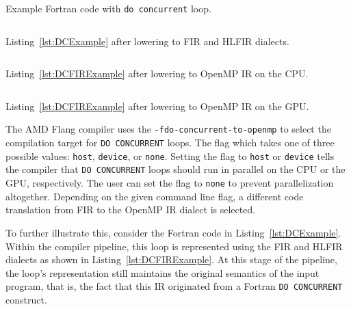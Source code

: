 \documentclass[acmtog,natbib=false]{acmart}
\newcommand{\code}[1]{\texttt{#1}\xspace}
\begin{document}
\begin{listing}[t]
\inputminted{Fortran}{code/dc_saxpy.f90}
\caption{Example Fortran code with \code{do concurrent} loop.}
\label{lst:DCExample}
\end{listing}

\begin{listing}[t]
\inputminted{MLIR-lexer.py:MlirLexer -x}{code/dc_fir.mlir}
\caption{Listing~\ref{lst:DCExample} after lowering to \acs{FIR} and \acs{HLFIR} dialects.}
\label{lst:DCFIRExample}
\end{listing}

\begin{listing}[t]
\inputminted{MLIR-lexer.py:MlirLexer -x}{code/dc_omp.mlir}
\caption{Listing~\ref{lst:DCFIRExample} after lowering to OpenMP \ac{IR} on the CPU.}
\label{lst:DCOMPExample}
\end{listing}

\begin{listing}[t]
\inputminted{MLIR-lexer.py:MlirLexer -x}{code/dc_omp_device.mlir}
\caption{Listing~\ref{lst:DCFIRExample} after lowering to OpenMP \ac{IR} on the GPU.}
\label{lst:DCOMPDeviceExample}
\end{listing}

The AMD Flang compiler uses the \code{-fdo-concurrent-to-openmp} to select the compilation target for \code{DO CONCURRENT} loops.  
The flag which takes one of three possible values: \code{host}, \code{device}, or \code{none}.
Setting the flag to \code{host} or \code{device} tells the compiler that \code{DO CONCURRENT} loops should run in parallel on the CPU or the GPU, respectively.
The user can set the flag to \code{none} to prevent parallelization altogether.
Depending on the given command line flag, a different code translation from \ac{FIR} to the OpenMP \ac{IR} dialect is selected.


To further illustrate this, consider the Fortran code in Listing~\ref{lst:DCExample}.
Within the compiler pipeline, this loop is represented using the \ac{FIR} and \ac{HLFIR} dialects as shown in Listing~\ref{lst:DCFIRExample}.
At this stage of the pipeline, the loop's representation still maintains the original semantics of the input program, that is, the fact that this IR originated from a Fortran \code{DO CONCURRENT} construct.
\end{document}
